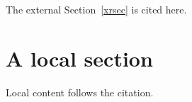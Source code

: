 \documentclass{article}
\begin{document}
The external Section~\ref{xrsec} is cited here.
\section{A local section}
Local content follows the citation.
\end{document}
